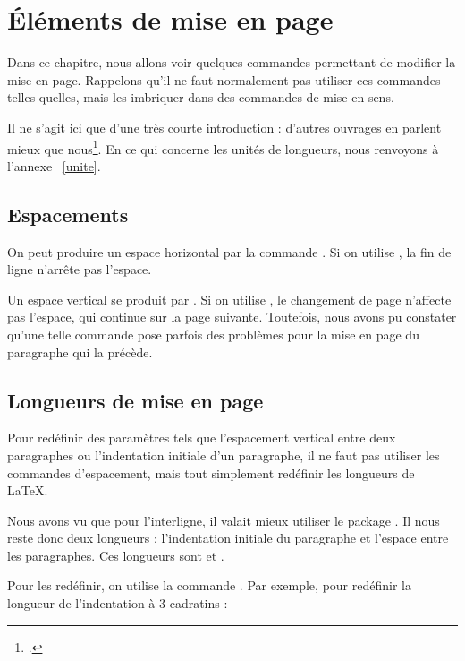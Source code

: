 \chapter{Éléments de mise en page}\label{espacement}

\begin{intro}
Dans ce chapitre, nous allons voir quelques commandes permettant de modifier la mise en page.
Rappelons qu'il ne faut normalement pas utiliser ces commandes telles quelles, mais les imbriquer dans des commandes de mise en sens.

Il ne s'agit ici que d'une très courte introduction : d'autres ouvrages en parlent mieux que nous\footcites(En particulier)(){frama}{latex_graphic_companion}.
En ce qui concerne les unités de longueurs, nous renvoyons à l'annexe~ \ref{unite}.
\end{intro}

\section{Espacements}\label{espace}

On peut produire un espace horizontal par la commande . Si on utilise , la fin de ligne n'arrête pas l'espace.

Un espace vertical se produit par . Si on utilise , le changement de page n'affecte pas  l'espace, qui continue sur la page suivante. Toutefois, nous avons pu constater qu'une telle commande pose parfois des problèmes pour la mise en page du paragraphe qui la précède.



\section{Longueurs de mise en page}

Pour redéfinir des paramètres tels que l'espacement vertical entre deux paragraphes ou l'indentation initiale d'un paragraphe, il ne faut pas utiliser les commandes d'espacement, mais tout simplement redéfinir les longueurs de \LaTeX. 

Nous avons vu que pour l'interligne, il valait mieux utiliser le package . Il nous reste donc deux longueurs : l'indentation initiale du paragraphe et l'espace entre les paragraphes. Ces longueurs sont  et .

Pour les redéfinir, on utilise la commande . Par exemple, pour redéfinir la longueur de l'indentation à 3 cadratins :\label{setlength}

